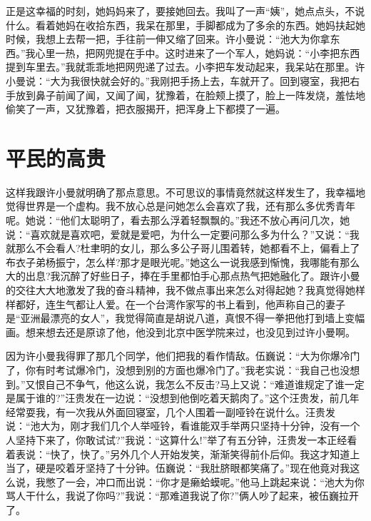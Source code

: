 \documentclass[12pt,oneside]{book}
\begin{document}
正是这幸福的时刻，她妈妈来了，要接她回去。我叫了一声``姨''，她点点头，不说什么。看着她妈在收拾东西，我呆在那里，手脚都成为了多余的东西。她妈扶起她时候，我想上去帮一把，手往前一伸又缩了回来。许小曼说：``池大为你拿东西。''我心里一热，把网兜提在手中。这时进来了一个军人，她妈说：``小李把东西提到车里去。''我就乖乖地把网兜递了过去。小李把车发动起来，我呆站在那里。许小曼说：``大为我很快就会好的。''我刚把手扬上去，车就开了。回到寝室，我把右手放到鼻子前闻了闻，又闻了闻，犹豫着，在脸颊上摸了，脸上一阵发烧，羞怯地偷笑了一声，又犹豫着，把衣服揭开，把浑身上下都摸了一遍。


\chapter{平民的高贵}
这样我跟许小曼就明确了那点意思。不可思议的事情竟然就这样发生了，我幸福地觉得世界是一个虚构。我不放心总是问她怎么会喜欢了我，还有那么多优秀青年呢。她说：``他们太聪明了，看去那么浮着轻飘飘的。''我还不放心再问几次，她说：``喜欢就是喜欢吧，爱就是爱吧，为什么一定要问那么多为什么？''又说：``我就那么不会看人?杜聿明的女儿，那么多公子哥儿围着转，她都看不上，偏看上了布衣子弟杨振宁，怎么样?那才是眼光呢。''她这么一说我感到惭愧，我哪能有那么大的出息?我沉醉了好些日子，捧在手里都怕手心那点热气把她融化了。跟许小曼的交往大大地激发了我的奋斗精神，我不做点事出来怎么对得起她？我真觉得她样样都好，连生气都让人爱。在一个台湾作家写的书上看到，他声称自己的妻子是``亚洲最漂亮的女人''，我觉得简直是胡说八道，真恨不得一拳把他打到墙上变幅画。想来想去还是原谅了他，他没到北京中医学院来过，也没见到过许小曼啊。

因为许小曼我得罪了那几个同学，他们把我的看作情敌。伍巍说：``大为你爆冷门了，你有时考试爆冷门，没想到别的方面也爆冷门了。''我老实说：``我自己也没想到。''又恨自己不争气，他这么说，我怎么不反击?马上又说：``难道谁规定了谁一定是属于谁的?''汪贵发在一边说：``没想到他倒吃着天鹅肉了。''这个汪贵发，前几年经常耍我，有一次我从外面回寝室，几个人围着一副哑铃在说什么。汪贵发说：``池大为，刚才我们几个人举哑铃，看谁能双手举两只坚持十分钟，没有一个人坚持下来了，你敢试试?''我说：``这算什么!''举了有五分钟，汪贵发一本正经看着表说：``快了，快了。''另外几个人开始发笑，渐渐笑得前仆后仰。我这才知道上当了，硬是咬着牙坚持了十分钟。伍巍说：``我肚脐眼都笑痛了。''现在他竟对我这么说，我憋了一会，冲口而出说：``你才是癞蛤蟆呢。''他马上跳起来说：``池大为你骂人干什么，我说了你吗?''我说：``那难道我说了你?''俩人吵了起来，被伍巍拉开了。
\end{document}
